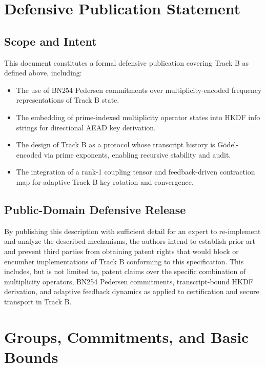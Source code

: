 \documentclass[11pt]{article}
\begin{document}
\section{Defensive Publication Statement}

\subsection*{Scope and Intent}

This document constitutes a formal defensive publication covering Track B as defined above, including:

\begin{itemize}[leftmargin=1.5em]
  \item The use of BN254 Pedersen commitments over multiplicity-encoded frequency representations of Track B state.
  \item The embedding of prime-indexed multiplicity operator states into HKDF info strings for directional AEAD key derivation.
  \item The design of Track B as a protocol whose transcript history is G\"odel-encoded via prime exponents, enabling recursive stability and audit.
  \item The integration of a rank-1 coupling tensor and feedback-driven contraction map for adaptive Track B key rotation and convergence.
\end{itemize}

\subsection*{Public-Domain Defensive Release}

By publishing this description with sufficient detail for an expert to re-implement and analyze the described mechanisms, the authors intend to establish prior art and prevent third parties from obtaining patent rights that would block or encumber implementations of Track B conforming to this specification.
This includes, but is not limited to, patent claims over the specific combination of multiplicity operators, BN254 Pedersen commitments, transcript-bound HKDF derivation, and adaptive feedback dynamics as applied to certification and secure transport in Track B.

\appendix
\section{Groups, Commitments, and Basic Bounds}
\end{document}
